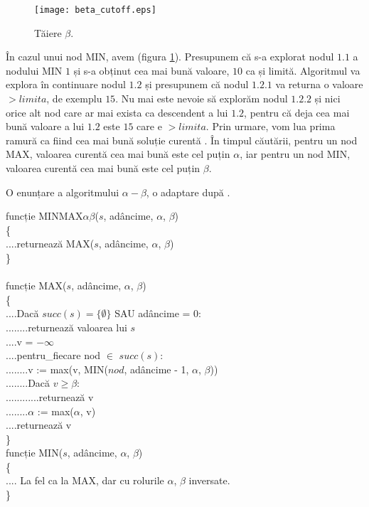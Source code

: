 \documentclass[12pt,twoside,a4paper,fleqn]{book}
\theoremstyle{definition}
\begin{document}
\begin{figure}[h]
\begin{center}
\texttt{[image: beta\_cutoff.eps]}
\caption{\small{Tăiere $\beta$.}}
\label{fig:beta_cutoff}
\end{center}
\end{figure}

În cazul unui nod MIN, avem (figura \ref{fig:beta_cutoff}). Presupunem că s-a explorat nodul $1.1$ a nodului MIN $1$ și s-a obținut cea mai bună valoare, $10$ ca și limită. Algoritmul va explora în continuare nodul $1.2$ și presupunem că nodul $1.2.1$ va returna o valoare $ > limita$, de exemplu $15$. Nu mai este nevoie să explorăm nodul $1.2.2$ și nici orice alt nod care ar mai exista ca descendent a lui $1.2$, pentru că deja cea mai bună valoare a lui $1.2$ este $15$ care e $> limita$. Prin urmare, vom lua prima ramură ca fiind cea mai bună soluție curentă \cite{sheng_hsu}. În timpul căutării, pentru un nod MAX, valoarea curentă cea mai bună este cel puțin $\alpha$, iar 
pentru un nod MIN, valoarea curentă cea mai bună este cel puțin $\beta$.

O enunțare a algoritmului $\alpha-\beta$, o adaptare după \cite{dana_nau_game_tree_search}.
\begin{pseudocod}
funcție MINMAX$\alpha \beta$($s$, adâncime, $\alpha$, $\beta$)\\
\{\\
....returnează MAX($s$, adâncime, $\alpha$, $\beta$)\\
\}\\
\\
funcție MAX($s$, adâncime, $\alpha$, $\beta$)\\
\{\\
....Dacă $succ(s) = \{\emptyset\}$ SAU adâncime = $0$:\\
........returnează valoarea lui $s$\\

....v = $-\infty$\\
....pentru\_fiecare nod $\in$ $succ(s)$:\\
........v := max(v, MIN($nod$, adâncime - 1, $\alpha$, $\beta$))\\
........Dacă $v \geq \beta$:\\
............returnează v\\
........$\alpha$ := max($\alpha$, v)\\
....returnează v\\
\}\\

funcție MIN($s$, adâncime, $\alpha$, $\beta$)\\
\{\\
.... La fel ca la MAX, dar cu rolurile $\alpha$, $\beta$ inversate.\\
\}


\caption{Algoritmul MINMAX cu $\alpha \beta$}
\end{pseudocod}
\end{document}
